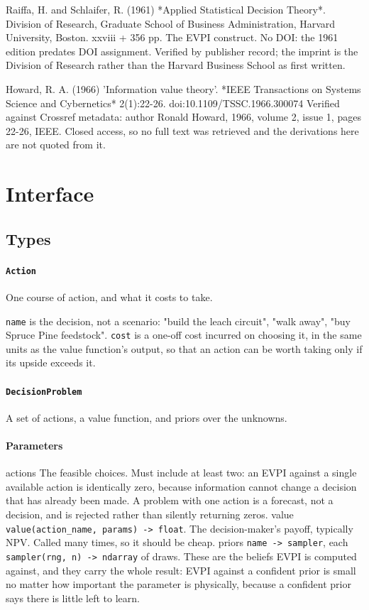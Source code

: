 \documentclass[10pt,a4paper,twoside]{report}
\begin{document}
Raiffa, H. and Schlaifer, R. (1961) *Applied Statistical Decision Theory*. Division of Research, Graduate School of Business Administration, Harvard University, Boston. xxviii + 356 pp. The EVPI construct. No DOI: the 1961 edition predates DOI assignment. Verified by publisher record; the imprint is the Division of Research rather than the Harvard Business School as first written.

Howard, R. A. (1966) 'Information value theory'. *IEEE Transactions on Systems Science and Cybernetics* 2(1):22-26. doi:10.1109/TSSC.1966.300074 Verified against Crossref metadata: author Ronald Howard, 1966, volume 2, issue 1, pages 22-26, IEEE. Closed access, so no full text was retrieved and the derivations here are not quoted from it.

\section{Interface}

\subsection*{Types}

\paragraph{\texttt{Action}}

One course of action, and what it costs to take.

\texttt{name} is the decision, not a scenario: "build the leach circuit", "walk away", "buy Spruce Pine feedstock". \texttt{cost} is a one-off cost incurred on choosing it, in the same units as the value function's output, so that an action can be worth taking only if its upside exceeds it.

\paragraph{\texttt{DecisionProblem}}

A set of actions, a value function, and priors over the unknowns.

\paragraph*{Parameters}

actions The feasible choices. Must include at least two: an EVPI against a single available action is identically zero, because information cannot change a decision that has already been made. A problem with one action is a forecast, not a decision, and is rejected rather than silently returning zeros. value \texttt{value(action\_name, params) -> float}. The decision-maker's payoff, typically NPV. Called many times, so it should be cheap. priors \texttt{name -> sampler}, each \texttt{sampler(rng, n) -> ndarray} of draws. These are the beliefs EVPI is computed against, and they carry the whole result: EVPI against a confident prior is small no matter how important the parameter is physically, because a confident prior says there is little left to learn.
\end{document}
